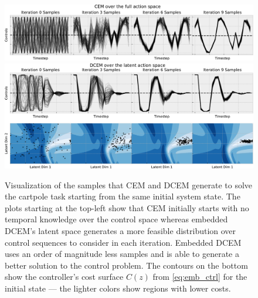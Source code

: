 \documentclass{article}
\begin{document}
\begin{figure}[t]
  \centering
  \includegraphics[width=\textwidth]{images/cartpole/cem-vis-full-space.pdf} \\[4mm]
  \includegraphics[width=\textwidth]{images/cartpole/cem-vis-latent-space.pdf}
  \caption{
    Visualization of the samples that CEM and DCEM generate
    to solve the cartpole task starting from the same initial
    system state.
    The plots starting at the top-left show that CEM initially starts with
    no temporal knowledge over the control space whereas embedded
    DCEM's latent space generates a more feasible distribution
    over control sequences to consider in each iteration.
    Embedded DCEM uses an order of magnitude less samples and is
    able to generate a better solution to the control problem.
    The contours on the bottom show the controller's cost
    surface $C(z)$ from \cref{eq:emb_ctrl} for
    the initial state --- the lighter colors show
    regions with lower costs.
  }
  \label{fig:emb:cp}
\end{figure}
\end{document}
